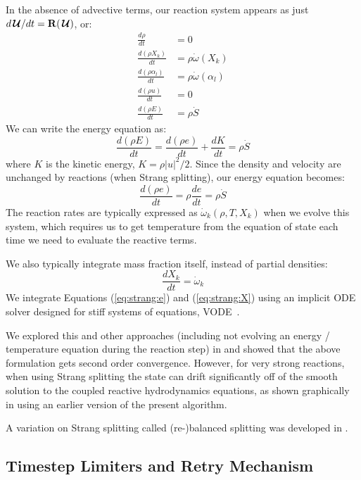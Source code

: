 \documentclass[times,modern]{aastex63}
\newcommand{\omegadot}{\dot{\omega}}
\newcommand{\Sdot}{\dot{S}}
\newcommand{\odt}[1]{{\frac{{d#1}}{dt}}}
\newcommand{\Uc}{{\,\bm{\mathcal{U}}}}
\newcommand{\Rb}{{\bf R}}
\begin{document}
In the absence of advective terms, our reaction system appears as just
$d\Uc/dt = \Rb(\Uc)$, or:
\begin{align}
\odt{\rho} & = 0 \\
\odt{(\rho X_k)} &= \rho \omegadot(X_k) \\
\odt{(\rho \alpha_l)} &= \rho \omegadot(\alpha_l) \\
\odt{(\rho u)} &= 0 \\
\odt{(\rho E)} &= \rho \Sdot
\end{align}
We can write the energy equation as:
\begin{equation}
\odt{(\rho E)} = \odt{(\rho e)} + \odt{K} = \rho \Sdot
\end{equation}
where $K$ is the kinetic energy, $K = \rho |u|^2/2$.  Since the density and velocity
are unchanged by reactions (when Strang splitting), our energy equation becomes:
\begin{equation}
\label{eq:strang:e}
\odt{(\rho e)} = \rho \odt{e} = \rho \Sdot
\end{equation}
The reaction rates are typically expressed as $\omegadot_k(\rho, T, X_k)$
when we evolve this system, which requires us to get temperature from
the equation of state each
time we need to evaluate the reactive terms.  

We also typically integrate mass fraction itself, instead of partial
densities:
\begin{equation}
\label{eq:strang:X}
\odt{X_k} = \omegadot_k
\end{equation}
We integrate Equations (\ref{eq:strang:e}) and (\ref{eq:strang:X}) using
an implicit ODE solver designed for stiff systems of
equations, VODE~\citep{vode}.

We explored this and other approaches (including not evolving an
energy / temperature equation during the reaction step) in
\citet{strang_rnaas} and showed that the above formulation gets second
order convergence.  However, for very strong reactions, when using
Strang splitting the state can drift significantly off of the smooth
solution to the coupled reactive hydrodynamics equations, as shown
graphically in \cite{astronum:2018} using an earlier version of the
present algorithm.

A variation on Strang splitting called (re-)balanced splitting was
developed in \citet{speth:2013}.


\subsection{Timestep Limiters and Retry Mechanism}
\end{document}

